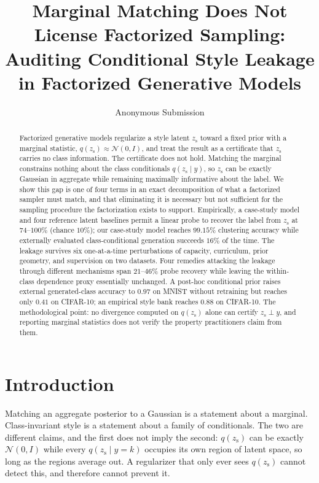 \documentclass[letterpaper]{article} %
\title{Marginal Matching Does Not License Factorized Sampling:\\
Auditing Conditional Style Leakage in Factorized Generative Models}
\author{Anonymous Submission}
\newcommand{\zs}{z_{\mathrm{s}}}
\begin{document}
\maketitle

\begin{abstract}
Factorized generative models regularize a style latent $\zs$ toward a fixed
prior with a marginal statistic, $q(\zs)\approx\mathcal N(0,I)$, and treat
the result as a certificate that $\zs$ carries no class information. The
certificate does not hold. Matching the marginal constrains nothing about
the class conditionals $q(\zs\mid y)$, so $\zs$ can be exactly Gaussian in
aggregate while remaining maximally informative about the label. We show
this gap is one of four terms in an exact decomposition of what a factorized
sampler must match, and that eliminating it is necessary but not sufficient
for the sampling procedure the factorization exists to support. Empirically,
a case-study model and four reference latent baselines permit a linear probe
to recover the label from $\zs$ at
$74$--$100\%$ (chance $10\%$); our case-study
model reaches $99.15\%$ clustering accuracy while externally evaluated
class-conditional generation succeeds $16\%$ of the time. The leakage
survives six one-at-a-time perturbations of capacity, curriculum, prior
geometry, and supervision on two datasets. Four remedies attacking the leakage through
different mechanisms span $21$--$46\%$ probe recovery while leaving the
within-class dependence proxy essentially unchanged. A post-hoc conditional
prior raises external generated-class accuracy to $0.97$ on MNIST without
retraining but reaches only $0.41$ on CIFAR-10; an empirical style bank
reaches $0.88$ on CIFAR-10. The methodological point: no divergence computed
on $q(\zs)$ alone can certify $\zs\perp y$, and reporting marginal statistics
does not verify the property practitioners claim from them.
\end{abstract}

\section{Introduction}
\label{sec:intro}

Matching an aggregate posterior to a Gaussian is a statement about a
marginal. Class-invariant style is a statement about a family of
conditionals. The two are different claims, and the first does not imply the
second: $q(\zs)$ can be exactly $\mathcal N(0,I)$ while every $q(\zs\mid
y{=}k)$ occupies its own region of latent space, so long as the regions
average out. A regularizer that only ever sees $q(\zs)$ cannot detect this,
and therefore cannot prevent it.
\end{document}
